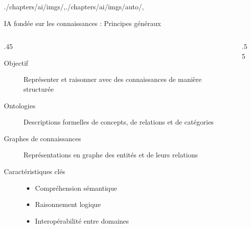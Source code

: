 \begin{graphicspathcontext}{{./chapters/ai/imgs/},{./chapters/ai/imgs/auto/},\old}

\begin{frame}[t,fragile]{{IA fondée sur les connaissances :} Principes généraux}
	\begin{columns}
		\begin{column}{.45\linewidth}
			\begin{block}{}
				\begin{description}
					\item[Objectif] Représenter et raisonner avec des connaissances de manière structurée
					\item[Ontologies] Descriptions formelles de concepts, de relations et de catégories
					\item[Graphes de connaissances] Représentations en graphe des entités et de leurs relations
					\item[Caractéristiques clés]
						\begin{itemize}
						\item Compréhension sémantique
						\item Raisonnement logique
						\item Interopérabilité entre domaines
						\end{itemize}
				\end{description}
			\end{block}
		\end{column}
		\begin{column}{.55\linewidth}
		\end{column}
	\end{columns}
\end{frame}

\end{graphicspathcontext}

\endinput

